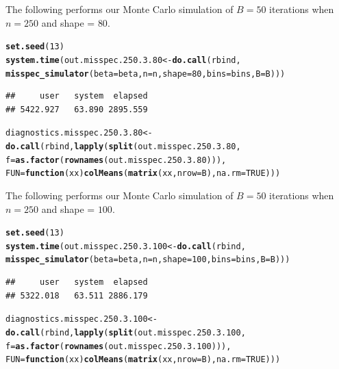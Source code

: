 \documentclass[11pt]{article}\usepackage[]{graphicx}\usepackage[]{color}
\makeatletter
\newcommand{\hlnum}[1]{\textcolor[rgb]{0.686,0.059,0.569}{#1}}%
\newcommand{\hlstd}[1]{\textcolor[rgb]{0.345,0.345,0.345}{#1}}%
\newcommand{\hlkwa}[1]{\textcolor[rgb]{0.161,0.373,0.58}{\textbf{#1}}}%
\newcommand{\hlkwb}[1]{\textcolor[rgb]{0.69,0.353,0.396}{#1}}%
\newcommand{\hlkwc}[1]{\textcolor[rgb]{0.333,0.667,0.333}{#1}}%
\newcommand{\hlkwd}[1]{\textcolor[rgb]{0.737,0.353,0.396}{\textbf{#1}}}%
\newenvironment{kframe}{%
 \def\at@end@of@kframe{}%
 \ifinner\ifhmode%
  \def\at@end@of@kframe{\end{minipage}}%
  \begin{minipage}{\columnwidth}%
 \fi\fi%
 \def\FrameCommand##1{\hskip\@totalleftmargin \hskip-\fboxsep
 \colorbox{shadecolor}{##1}\hskip-\fboxsep
     \hskip-\linewidth \hskip-\@totalleftmargin \hskip\columnwidth}%
 \MakeFramed {\advance\hsize-\width
   \@totalleftmargin\z@ \linewidth\hsize
   \@setminipage}}%
 {\par\unskip\endMakeFramed%
 \at@end@of@kframe}
\newenvironment{knitrout}{}{} %
\makeatother
\begin{document}
The following performs our Monte Carlo simulation of $B = 50$ iterations 
when $n = 250$ and shape = $80$.

\begin{knitrout}
\color{fgcolor}\begin{kframe}
\begin{alltt}
\hlkwd{set.seed}\hlstd{(}\hlnum{13}\hlstd{)}
\hlkwd{system.time}\hlstd{(out.misspec.250.3.80} \hlkwb{<-} \hlkwd{do.call}\hlstd{(rbind,}
  \hlkwd{misspec_simulator}\hlstd{(}\hlkwc{beta} \hlstd{= beta,} \hlkwc{n} \hlstd{= n,} \hlkwc{shape} \hlstd{=} \hlnum{80}\hlstd{,} \hlkwc{bins} \hlstd{= bins,} \hlkwc{B} \hlstd{= B)))}
\end{alltt}
\begin{verbatim}
##     user   system  elapsed 
## 5422.927   63.890 2895.559
\end{verbatim}
\begin{alltt}
\hlstd{diagnostics.misspec.250.3.80} \hlkwb{<-} \hlkwd{do.call}\hlstd{(rbind,} \hlkwd{lapply}\hlstd{(}\hlkwd{split}\hlstd{(out.misspec.250.3.80,}
  \hlkwc{f} \hlstd{=} \hlkwd{as.factor}\hlstd{(}\hlkwd{rownames}\hlstd{(out.misspec.250.3.80))),}
  \hlkwc{FUN} \hlstd{=} \hlkwa{function}\hlstd{(}\hlkwc{xx}\hlstd{)} \hlkwd{colMeans}\hlstd{(}\hlkwd{matrix}\hlstd{(xx,} \hlkwc{nrow} \hlstd{= B),} \hlkwc{na.rm} \hlstd{=} \hlnum{TRUE}\hlstd{)))}
\end{alltt}
\end{kframe}
\end{knitrout}


The following performs our Monte Carlo simulation of $B = 50$ iterations 
when $n = 250$ and shape = $100$.

\begin{knitrout}
\color{fgcolor}\begin{kframe}
\begin{alltt}
\hlkwd{set.seed}\hlstd{(}\hlnum{13}\hlstd{)}
\hlkwd{system.time}\hlstd{(out.misspec.250.3.100} \hlkwb{<-} \hlkwd{do.call}\hlstd{(rbind,}
  \hlkwd{misspec_simulator}\hlstd{(}\hlkwc{beta} \hlstd{= beta,} \hlkwc{n} \hlstd{= n,} \hlkwc{shape} \hlstd{=} \hlnum{100}\hlstd{,} \hlkwc{bins} \hlstd{= bins,} \hlkwc{B} \hlstd{= B)))}
\end{alltt}
\begin{verbatim}
##     user   system  elapsed 
## 5322.018   63.511 2886.179
\end{verbatim}
\begin{alltt}
\hlstd{diagnostics.misspec.250.3.100} \hlkwb{<-} \hlkwd{do.call}\hlstd{(rbind,} \hlkwd{lapply}\hlstd{(}\hlkwd{split}\hlstd{(out.misspec.250.3.100,}
  \hlkwc{f} \hlstd{=} \hlkwd{as.factor}\hlstd{(}\hlkwd{rownames}\hlstd{(out.misspec.250.3.100))),}
  \hlkwc{FUN} \hlstd{=} \hlkwa{function}\hlstd{(}\hlkwc{xx}\hlstd{)} \hlkwd{colMeans}\hlstd{(}\hlkwd{matrix}\hlstd{(xx,} \hlkwc{nrow} \hlstd{= B),} \hlkwc{na.rm} \hlstd{=} \hlnum{TRUE}\hlstd{)))}
\end{alltt}
\end{kframe}
\end{knitrout}
\end{document}

